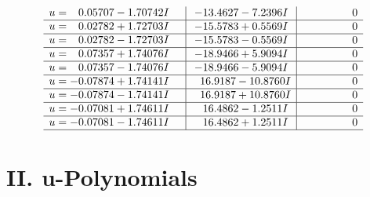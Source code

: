 \documentclass[1p]{elsarticle_modified}
\theoremstyle{definition}
\begin{document}
$$\begin{array}{c|c|c}
\begin{aligned}
u &= \phantom{-}0.05707 - 1.70742 I\end{aligned}
 & -13.4627 - 7.2396 I & \phantom{-0.000000 } 0 \\ \hline\begin{aligned}
u &= \phantom{-}0.02782 + 1.72703 I\end{aligned}
 & -15.5783 + 0.5569 I & \phantom{-0.000000 } 0 \\ \hline\begin{aligned}
u &= \phantom{-}0.02782 - 1.72703 I\end{aligned}
 & -15.5783 - 0.5569 I & \phantom{-0.000000 } 0 \\ \hline\begin{aligned}
u &= \phantom{-}0.07357 + 1.74076 I\end{aligned}
 & -18.9466 + 5.9094 I & \phantom{-0.000000 } 0 \\ \hline\begin{aligned}
u &= \phantom{-}0.07357 - 1.74076 I\end{aligned}
 & -18.9466 - 5.9094 I & \phantom{-0.000000 } 0 \\ \hline\begin{aligned}
u &= -0.07874 + 1.74141 I\end{aligned}
 & \phantom{-}16.9187 - 10.8760 I & \phantom{-0.000000 } 0 \\ \hline\begin{aligned}
u &= -0.07874 - 1.74141 I\end{aligned}
 & \phantom{-}16.9187 + 10.8760 I & \phantom{-0.000000 } 0 \\ \hline\begin{aligned}
u &= -0.07081 + 1.74611 I\end{aligned}
 & \phantom{-}16.4862 - 1.2511 I & \phantom{-0.000000 } 0 \\ \hline\begin{aligned}
u &= -0.07081 - 1.74611 I\end{aligned}
 & \phantom{-}16.4862 + 1.2511 I & \phantom{-0.000000 } 0\\
 \hline 
 \end{array}$$\newpage
\newpage\renewcommand{\arraystretch}{1}
\centering \section*{ II. u-Polynomials}
\end{document}
